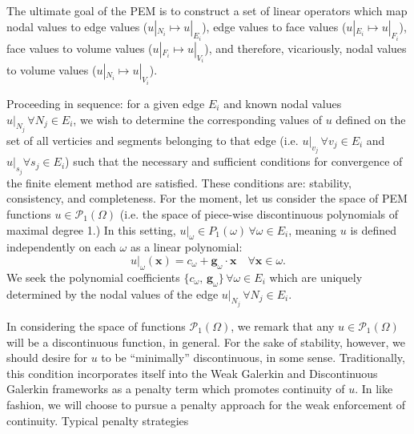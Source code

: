 \documentclass[11pt]{article} %
\begin{document}
The ultimate goal of the PEM is to construct a set of linear operators which map nodal values to edge values ($u|_{N_i} \mapsto u|_{E_i}$), edge values to face values ($u|_{E_i} \mapsto u|_{F_i}$), face values to volume values ($u|_{F_i} \mapsto u|_{V_i}$), and therefore, vicariously, nodal values to volume values ($u|_{N_i} \mapsto u|_{V_i}$).

Proceeding in sequence: for a given edge $E_i$ and known nodal values $u|_{N_j} \, \forall N_j \in E_i$, we wish to determine the corresponding values of $u$ defined on the set of all verticies and segments belonging to that edge (i.e. $u|_{v_j} \, \forall v_j \in E_i$ and $u|_{s_j} \forall s_j \in E_i$) such that the necessary and sufficient conditions for convergence of the finite element method are satisfied. These conditions are: stability, consistency, and completeness. For the moment, let us consider the space of PEM functions $u \in \mathcal{P}_1  (\Omega)$ (i.e. the space of piece-wise discontinuous polynomials of maximal degree 1.) In this setting, $u|_\omega \in P_1 (\omega) \, \forall \omega \in E_i$, meaning $u$ is defined independently on each $\omega$ as a linear polynomial:
\begin{equation}
	u|_\omega (\mathbf{x}) = c_\omega + \mathbf{g}_\omega \cdot \mathbf{x} \quad \forall \mathbf{x} \in \omega.
\end{equation}
We seek the polynomial coefficients $\{ c_\omega, \, \mathbf{g}_\omega \} \, \forall \omega \in E_i$ which are uniquely determined by the nodal values of the edge $u|_{N_j} \, \forall N_j \in E_i$.

In considering the space of functions $\mathcal{P}_1 (\Omega)$, we remark that any $u \in \mathcal{P}_1 (\Omega)$ will be a discontinuous function, in general. For the sake of stability, however, we should desire for $u$ to be ``minimally'' discontinuous, in some sense. Traditionally, this condition incorporates itself into the Weak Galerkin and Discontinuous Galerkin frameworks as a penalty term which promotes continuity of $u$. In like fashion, we will choose to pursue a penalty approach for the weak enforcement of continuity. Typical penalty strategies 
\end{document}
